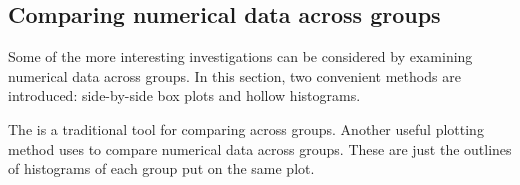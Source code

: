 \begin{doublespace}

\subsection{Comparing numerical data across groups}
\label{comparingAcrossGroups}
Some of the more interesting investigations can be considered by examining numerical data across groups. In this section, two convenient methods are introduced: side-by-side box plots and hollow histograms.

The   is a traditional tool for comparing across groups. Another useful plotting method uses  to compare numerical data across groups. These are just the outlines of histograms of each group put on the same plot.


\end{doublespace}
